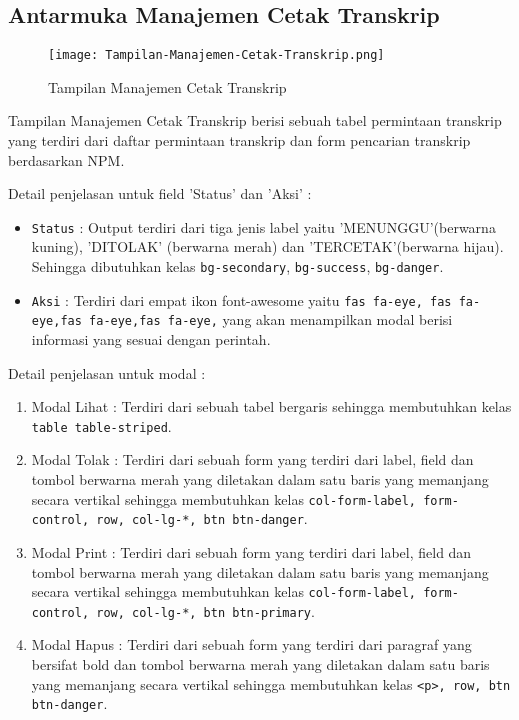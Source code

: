 \subsection{Antarmuka Manajemen Cetak Transkrip}
\begin{figure} [H]
	\centering  
	\texttt{[image: Tampilan-Manajemen-Cetak-Transkrip.png]}  
	\caption{Tampilan Manajemen Cetak Transkrip} 	
\end{figure}

Tampilan Manajemen Cetak Transkrip berisi sebuah tabel permintaan transkrip yang terdiri dari daftar permintaan transkrip dan form pencarian transkrip berdasarkan NPM. \par

\noindent Detail penjelasan untuk field 'Status' dan 'Aksi' :
\begin{itemize}
	\item[ ] \texttt{Status} : Output terdiri dari tiga jenis label yaitu 'MENUNGGU'(berwarna kuning), 'DITOLAK' (berwarna merah) dan 'TERCETAK'(berwarna hijau).  Sehingga dibutuhkan kelas \verb|bg-secondary|, \verb|bg-success|, \verb|bg-danger|. 
	\item[ ] \texttt{Aksi} : Terdiri dari empat ikon font-awesome yaitu \verb|fas fa-eye, fas fa-eye,fas fa-eye,fas fa-eye,| yang akan menampilkan modal berisi informasi yang sesuai dengan perintah.
\end{itemize}
Detail penjelasan untuk modal :
\begin{enumerate}
	\item Modal Lihat : Terdiri dari sebuah tabel bergaris sehingga membutuhkan kelas \verb|table table-striped|.
	\item Modal Tolak : Terdiri dari sebuah form yang terdiri dari label, field dan tombol berwarna merah yang diletakan dalam satu baris yang memanjang secara vertikal sehingga membutuhkan kelas \verb|col-form-label, form-control, row, col-lg-*, btn btn-danger|.
	\item Modal Print : Terdiri dari sebuah form yang terdiri dari label, field dan tombol berwarna merah yang diletakan dalam satu baris yang memanjang secara vertikal sehingga membutuhkan kelas \verb|col-form-label, form-control, row, col-lg-*, btn btn-primary|.
	\item Modal Hapus : Terdiri dari sebuah form yang terdiri dari paragraf yang bersifat bold dan tombol berwarna merah yang diletakan dalam satu baris yang memanjang secara vertikal sehingga membutuhkan kelas \verb|<p>, row, btn btn-danger|.
\end{enumerate}

